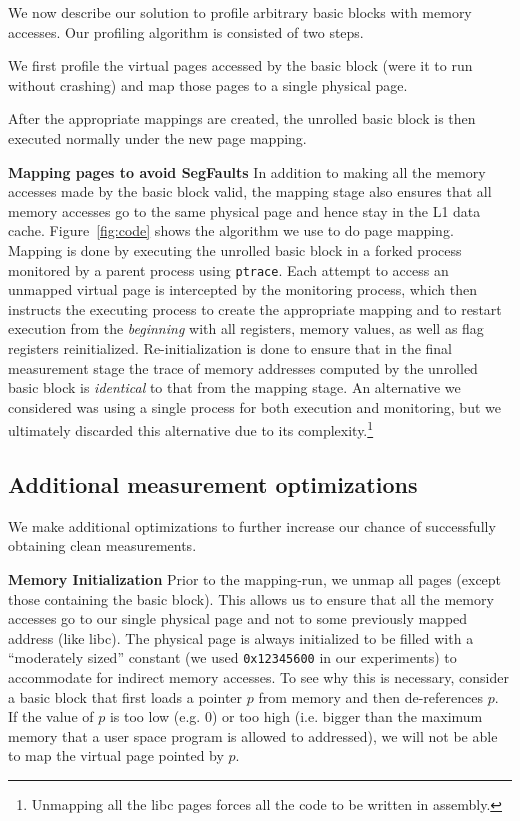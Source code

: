 We now describe our solution to profile arbitrary basic blocks with memory accesses.
Our profiling algorithm is consisted of two steps.
\begin{enumerate*}
\item We first profile the virtual pages accessed by
the basic block (were it to run without crashing)
and map those pages to a single physical page.
\item After the appropriate mappings are created,
the unrolled basic block is then executed normally under
the new page mapping.
\end{enumerate*}

\textbf{Mapping pages to avoid SegFaults}
In addition to making all the memory accesses made by the basic block valid,
the mapping stage also ensures that all memory accesses go to the same physical page and hence stay in the L1 data cache. 
Figure~\ref{fig:code} shows the algorithm we use to do page mapping.
Mapping is done by executing the unrolled basic block in a forked process
 monitored by a parent process using \verb|ptrace|.
Each attempt to access an unmapped virtual page is intercepted by
the monitoring process, which then instructs the 
executing process to create the appropriate mapping
and to restart execution from the \textit{beginning}
with all registers, memory values,
as well as flag registers reinitialized.
Re-initialization is done to ensure that in the final measurement
stage the trace of memory addresses computed by the 
unrolled basic block is \textit{identical} to that from the mapping stage.
An alternative we considered was using a single process for both execution
and monitoring, but we ultimately discarded this alternative due to
its complexity.\footnote{Unmapping all the libc pages forces all the code to be written in assembly.}

\subsection{Additional measurement optimizations}
We make additional optimizations to further increase our chance
of successfully obtaining clean measurements.

\textbf{Memory Initialization} 
Prior to the mapping-run,
we unmap all pages (except those containing the basic block).
This allows us to ensure that all the memory accesses go to our single 
physical page and not to some previously mapped address (like libc).
The physical page is
always initialized to be filled with a “moderately sized” constant
(we used \verb|0x12345600| in our experiments)
to accommodate for indirect memory accesses.
To see why this is necessary,
consider a basic block that first loads a pointer $p$ from memory
and then de-references $p$.
If the value of $p$ is too low (e.g. 0)
or too high
(i.e. bigger than the maximum memory that
a user space program is allowed to addressed),
we will not be able to map the virtual page pointed by $p$.

